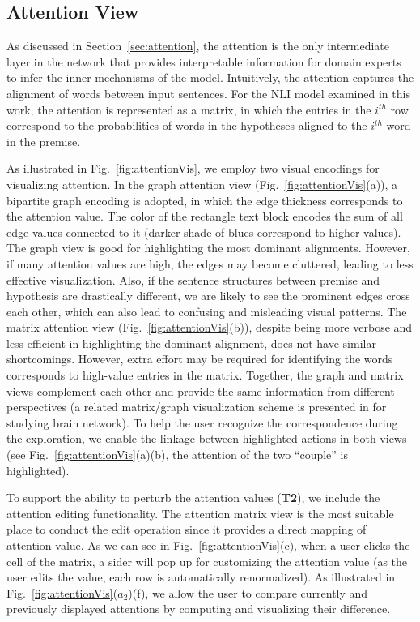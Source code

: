 

\subsection{Attention View}
\label{sec:attentionView}
As discussed in Section~\ref{sec:attention}, the attention is the only intermediate layer in the network that provides interpretable information for domain experts to infer the inner mechanisms of the model.
%
Intuitively, the attention captures the alignment of words between input sentences. For the NLI model examined in this work, the attention is represented as a matrix, in which the entries in the $i^{th}$ row correspond to the probabilities of words in the hypotheses aligned to the $i^{th}$ word in the premise.

As illustrated in Fig.~\ref{fig:attentionVis}, we employ two visual encodings for visualizing attention. In the graph attention view (Fig.~\ref{fig:attentionVis}(a)), a bipartite graph encoding is adopted, in which the edge thickness corresponds to the attention value. The color of the rectangle text block encodes the sum of all edge values connected to it (darker shade of blues correspond to higher values).
%
The graph view is good for highlighting the most dominant alignments. However, if many attention values are high, the edges may become cluttered, leading to less effective visualization. Also, if the sentence structures between premise and hypothesis are drastically different, we are likely to see the prominent edges cross each other, which can also lead to confusing and misleading visual patterns.
%
The matrix attention view (Fig.~\ref{fig:attentionVis}(b)), despite being more verbose and less efficient in highlighting the dominant alignment, does not have similar shortcomings. However, extra effort may be required for identifying the words corresponds to high-value entries in the matrix. Together, the graph and matrix views complement each other and provide the same information from different perspectives (a related matrix/graph visualization scheme is presented in \cite{MaKenyonForbes2015} for studying brain network). 
To help the user recognize the correspondence during the exploration, we enable the linkage between highlighted actions in both views (see Fig.~\ref{fig:attentionVis}(a)(b), the attention of the two ``couple'' is highlighted).

To support the ability to perturb the attention values (\textbf{T2}), we include the attention editing functionality. The attention matrix view is the most suitable place to conduct the edit operation since it provides a direct mapping of attention value.
As we can see in Fig.~\ref{fig:attentionVis}(c), when a user clicks the cell of the matrix, a sider will pop up for customizing the attention value (as the user edits the value, each row is automatically renormalized).
%
As illustrated in Fig.~\ref{fig:attentionVis}($a_{2}$)(f), we allow the user to compare currently and previously displayed attentions by computing and visualizing their difference.


